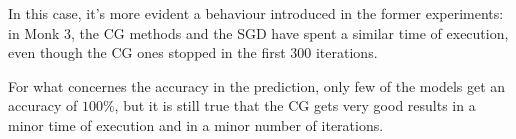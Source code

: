             In this case, it's more evident a behaviour introduced in the former experiments: in Monk 3, the CG methods and the SGD have spent a similar time of execution, even though the CG ones stopped in the first 300 iterations.

            For what concernes the accuracy in the prediction, only few of the models get an accuracy of $100\%$, but it is still true that the CG gets very good results in a minor time of execution and in a minor number of iterations.

            \begin{figure}[t!]
                \centering
                \begin{subfigure}{0.45\textwidth}
                    \caption{}
                    \label{fig:monks_1_MSE_all_max_iterations_t}
                \end{subfigure}
                \begin{subfigure}{0.45\textwidth}
\end{subfigure}
\end{figure}
